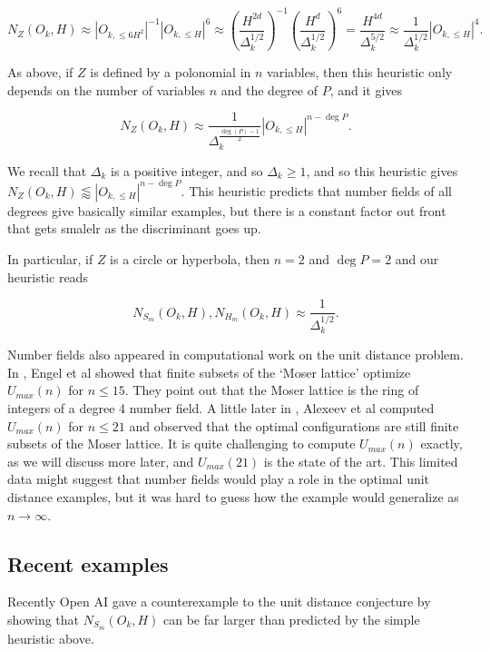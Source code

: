 \documentclass{amsart}
\newcommand{\heur}{\approx}
\begin{document}
$$ N_Z(O_k, H) \heur |O_{k, \le 6 H^2} |^{-1} |O_{k, \le H}|^6 \approx  \left( \frac{ H^{2d} }{\Delta_k^{1/2} }  \right)^{-1} \left( \frac{H^d}{\Delta_k^{1/2}} \right)^6  = \frac{H^{4d}}{\Delta_k^{5/2}} \heur \frac{1}{\Delta_k^{1/2}} |O_{k, \le H}|^4. $$

As above, if $Z$ is defined by a polonomial in $n$ variables, then this heuristic only depends on the number of variables $n$ and the degree of $P$, and it gives

$$ N_Z(O_k, H) \heur \frac{1}{\Delta_k^{ \frac{ \deg (P) - 1}{2}}} |O_{k, \le H} |^{n - \deg P}. $$

We recall that $\Delta_k$ is a positive integer, and so $\Delta_k \ge 1$, and so this heuristic gives $N_Z(O_k, H) \lessapprox |O_{k, \le H} |^{n - \deg P}$.  This heuristic predicts that number fields of all degrees give basically similar examples, but there is a constant factor out front that gets smalelr as the discriminant goes up.

In particular, if $Z$ is a circle or hyperbola, then $n=2$ and $\deg P = 2$ and our heuristic reads

$$ N_{S_m}(O_k, H), N_{H_m}(O_k, H) \heur \frac{1}{ \Delta_k^{1/2}}. $$

Number fields also appeared in computational work on the unit distance problem.    In \cite{Eng},  Engel et al showed that finite subsets of the `Moser lattice' optimize $U_{max}(n)$ for $n \le 15$.   They point out that the Moser lattice is the ring of integers of a degree 4 number field.   A little later in \cite{Ale},  Alexeev et al computed $U_{max}(n)$ for $n \le 21$ and observed that the optimal configurations are still finite subsets of the Moser lattice.   It is quite challenging to compute $U_{max}(n)$ exactly,  as we will discuss more later,  and $U_{max}(21)$ is the state of the art.   This limited data might suggest that number fields would play a role in the optimal unit distance examples, but it was hard to guess how the example would generalize as $n \rightarrow \infty$.  

\subsection{Recent examples} \label{subsecrecent}

Recently Open AI gave a counterexample to the unit distance conjecture by showing that $N_{S_m}(O_k, H)$ can be far larger than predicted by the simple heuristic above.  
\end{document}
